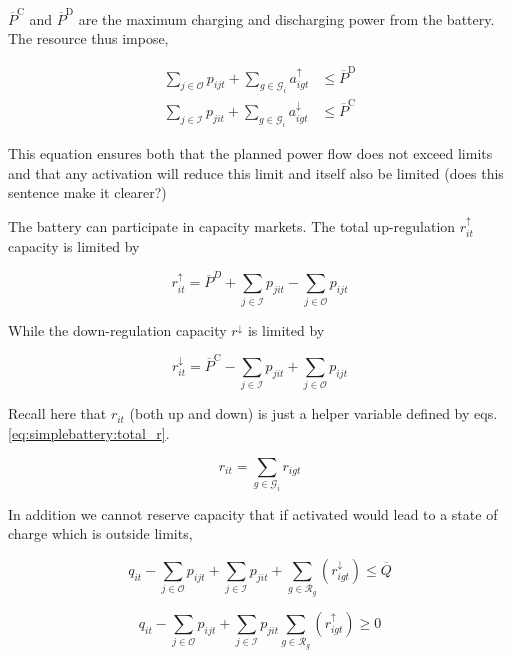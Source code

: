 \documentclass[]{report}
\newcommand{\resourcesg}{\mathcal{R}_g}
\newcommand{\groups}{\mathcal{G}}
\newcommand{\outputs}{\mathcal{O}}
\newcommand{\inputs}{\mathcal{I}}
\newcommand{\pmax}{\overline{P}}
\newcommand{\soc}{q}
\newcommand{\socmax}{\overline{Q}}
\newcommand{\pdmax}{\overline{P}^\mathrm{D}}
\newcommand{\pcmax}{\overline{P}^\mathrm{C}}
\newcommand{\aup}{a^{\uparrow}}
\newcommand{\adown}{a^{\downarrow}}
\newcommand{\rup}{r^{\uparrow}}
\newcommand{\rdown}{r^{\downarrow}}
\begin{document}
$\pcmax$ and $\pdmax$ are the maximum charging and discharging power from the battery. The resource thus impose,

\begin{align}
    \sum_{j \in \outputs} p_{ijt} + \sum_{g \in \groups_i} \aup_{igt} &\leq \pdmax \\
    \sum_{j \in \inputs} p_{jit} + \sum_{g \in \groups_i} \adown_{igt} &\leq \pcmax
\end{align}

This equation ensures both that the planned power flow does not exceed limits and that any activation will reduce this limit and itself also be limited (does this sentence make it clearer?)

The battery can participate in capacity markets. The total up-regulation $\rup_{it}$ capacity is limited by

\begin{equation}
    \label{eq:up-capacity-battery}
    \rup_{it} = \pmax^D + \sum_{j \in \inputs} p_{jit}- \sum_{j \in \outputs} p_{ijt}
\end{equation}

While the down-regulation capacity $\rdown$ is limited by

\begin{equation}
    \label{eq:down-capacity-battery}
    \rdown_{it} = \pcmax -   \sum_{j \in \inputs} p_{jit}+ \sum_{j \in \outputs} p_{ijt}
\end{equation}

Recall here that $r_{it}$ (both up and down) is just a helper variable defined by eqs. \ref{eq:simplebattery:total_r}.

\begin{equation}
    \label{eq:resource-groups}
    r_{it} = \sum_{g \in \groups_i} r_{igt}
\end{equation}

In addition we cannot reserve capacity that if activated would lead to a state of charge which is outside limits,

\begin{equation}
    \soc_{it} - \sum_{j \in \outputs} p_{ijt} + \sum_{j \in \inputs} p_{jit} + \sum_{g \in \resourcesg} (\rdown_{igt} )\leq \socmax
\end{equation}

\begin{equation}
    \soc_{it} - \sum_{j \in \outputs} p_{ijt} + \sum_{j \in \inputs} p_{jit}  \sum_{g \in \resourcesg} ( \rup_{igt}) \geq 0
\end{equation}
\end{document}
